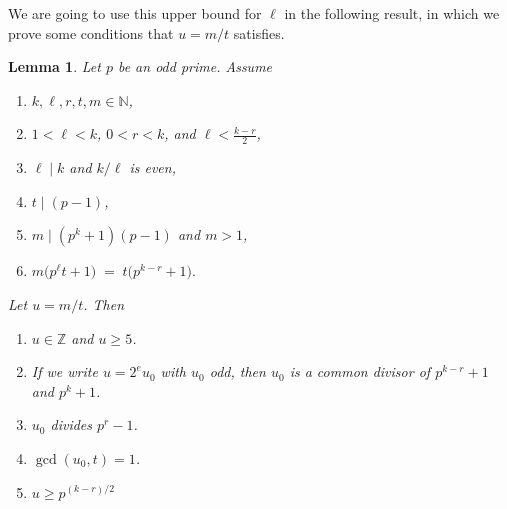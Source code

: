 \documentclass[oneside,a4paper,12pt]{article}
\theoremstyle{plain} %
\newtheorem{lemma}[theorem]{Lemma}
\theoremstyle{definition} %
\begin{document}
We are going to use this upper bound for $\ell$ in the following result, in which we prove some conditions that $u=m/t$ satisfies.

\begin{lemma}\label{general_div}
Let $p$ be an odd prime. Assume
\begin{enumerate}
  \item $k,\ell,r,t,m\in\mathbb{N}$, 
  \item $1<\ell < k$,  $0<r<k$, and $\ell < \frac{k-r}{2}$,
  \item $\ell\mid k$ and $k/\ell$ is even,
  \item $t\mid (p-1)$,
  \item $m\mid (p^k+1)(p-1)$ and $m>1$,
  \item $m\bigl(p^\ell t+1\bigr) \;=\; t\bigl(p^{k-r}+1\bigr).$
\end{enumerate}
Let $u=m/t$. Then 
\begin{enumerate}
\item $u\in \mathbb{Z}$ and $u\ge 5$.
\item If we write $u = 2^e u_0$ with $u_0$ odd,
then $u_0$ is a common divisor of $p^{k-r}+1$ and $p^k+1$.
\item $u_0$ divides $p^r-1$.
\item $\gcd(u_0,t)=1$.
\item $u \ge p^{(k-r)/2}$
\end{enumerate}
\end{lemma}
\end{document}
